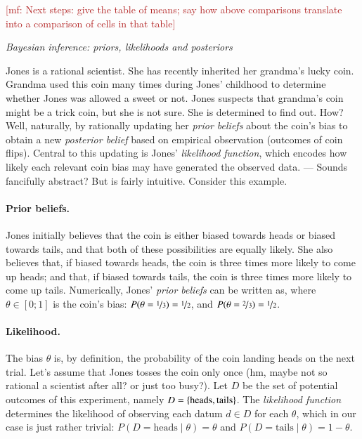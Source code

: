 \documentclass[nobib]{tufte-handout}
\renewcommand{\mf}[1]{\textcolor{firebrick}{[mf: #1]}}
\begin{document}
\mf{Next steps: give the table of means; say how above comparisons translate into a comparison of cells in that table}

\newpage

\begin{InfoBox}[t]
\centering
\colorbox{mygray}{\centering
  \begin{minipage}{1.0\textwidth}

    \emph{Bayesian inference: priors, likelihoods and posteriors}
    \medskip

    Jones is a rational scientist. She has recently inherited her grandma's lucky coin. Grandma
    used this coin many times during Jones' childhood to determine whether Jones was allowed a
    sweet or not. Jones suspects that grandma's coin might be a trick coin, but she is not
    sure. She is determined to find out. How? Well, naturally, by rationally updating her
    \emph{prior beliefs} about the coin's bias to obtain a new \emph{posterior belief} based on
    empirical observation (outcomes of coin flips). Central to this updating is Jones'
    \emph{likelihood function}, which encodes how likely each relevant coin bias may have
    generated the observed data. --- Sounds fancifully abstract? But is fairly intuitive.
    Consider this example.
    
    \paragraph{Prior beliefs.} Jones initially believes that the coin is either biased towards
    heads or biased towards tails, and that both of these possibilities are equally likely. She
    also believes that, if biased towards heads, the coin is three times more likely to come up
    heads; and that, if biased towards tails, the coin is three times more likely to come up
    tails. Numerically, Jones' \emph{prior beliefs} can be written as, where $\theta \in [0;1]$
    is the coin's bias: $P(\theta = \nicefrac{1}{3}) = \nicefrac{1}{2}$, and $P(\theta =
    \nicefrac{2}{3}) = \nicefrac{1}{2}$.

    \paragraph{Likelihood.} The bias $\theta$ is, by definition, the probability of the coin
    landing heads on the next trial. Let's assume that Jones tosses the coin only once (hm,
    maybe not so rational a scientist after all? or just too busy?). Let $D$ be the set of
    potential outcomes of this experiment, namely $D = \left\{\text{heads}, \text{tails}\right\}$. The
    \emph{likelihood function} determines the likelihood of observing each datum $d \in D$ for
    each $\theta$, which in our case is just rather trivial: $P(D = \text{heads} \mid \theta) =
    \theta$ and $P(D = \text{tails} \mid \theta) = 1 - \theta$.


\end{minipage}}
\end{InfoBox}
\end{document}
